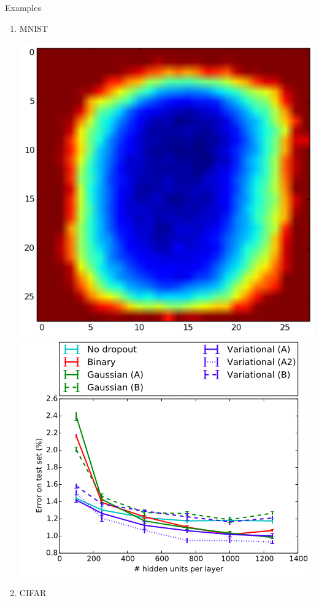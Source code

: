\documentclass{beamer}
\begin{document}
\begin{frame}{Examples}
	\begin{enumerate}
		\item MNIST
			\begin{center}
				\includegraphics[scale=0.18]{img/mnist_reg}
				\includegraphics[scale=0.2]{img/mnist}
			\end{center}
		\item CIFAR
			\begin{center}

\end{center}
\end{enumerate}
\end{frame}
\end{document}
